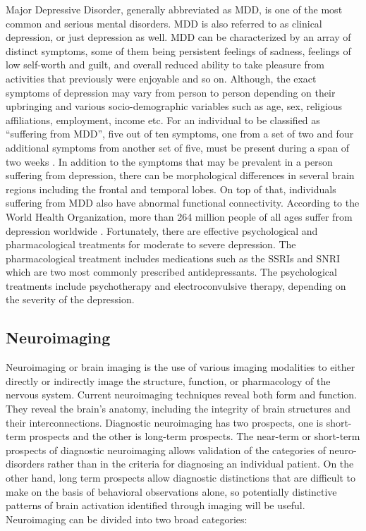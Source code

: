 ﻿\documentclass[12pt]{article}
\begin{document}
Major Depressive Disorder, generally abbreviated as MDD, is one of the
most common and serious mental disorders. MDD is also referred to as
clinical depression, or just depression as well. MDD can be
characterized by an array of distinct symptoms, some of them being
persistent feelings of sadness, feelings of low self-worth and guilt,
and overall reduced ability to take pleasure from activities that
previously were enjoyable and so on. Although, the exact symptoms of
depression may vary from person to person depending on their
upbringing and various socio-demographic variables such as age, sex,
religious affiliations, employment, income etc. For an individual to
be classified as ``suffering from MDD'', five out of ten symptoms, one
from a set of two and four additional symptoms from another set of
five, must be present during a span of two weeks
\cite{whodepression}. In addition to the symptoms that may be
prevalent in a person suffering from depression, there can be
morphological differences in several brain regions including the
frontal and temporal lobes. On top of that, individuals suffering from
MDD also have abnormal functional connectivity. According to the World
Health Organization, more than 264 million people of all ages suffer
from depression worldwide \cite{whodepression}. Fortunately, there are
effective psychological and pharmacological treatments for moderate to
severe depression. The pharmacological treatment includes medications
such as the SSRIs and SNRI which are two most commonly prescribed
antidepressants. The psychological treatments include psychotherapy
and electroconvulsive therapy, depending on the severity of the
depression.

\subsection{Neuroimaging}

Neuroimaging or brain imaging is the use of various imaging modalities
to either directly or indirectly image the structure, function, or
pharmacology of the nervous system. Current neuroimaging techniques
reveal both form and function. They reveal the brain’s anatomy,
including the integrity of brain structures and their
interconnections. Diagnostic neuroimaging has two prospects, one is
short-term prospects and the other is long-term prospects. The
near-term or short-term prospects of diagnostic neuroimaging allows
validation of the categories of neuro-disorders rather than in the
criteria for diagnosing an individual patient. On the other hand,
long term prospects allow diagnostic distinctions that are difficult
to make on the basis of behavioral observations alone, so potentially
distinctive patterns of brain activation identified through imaging
will be useful. Neuroimaging can be divided into two broad categories:
\end{document}
